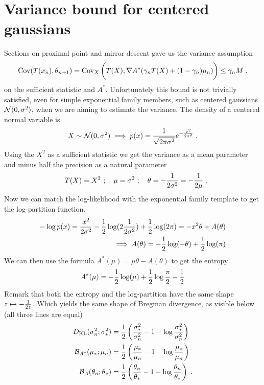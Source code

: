\documentclass{article}
\newcommand{\logpart}{A}
\newcommand{\conj}{\logpart^*}
\newcommand{\bregman}{\cB_\logpart}
\newcommand{\bregmanconj}{\cB_{\logpart^*}}
\newcommand{\natp}{\theta}
\newcommand{\lr}{\gamma} %
\begin{document}
\section{Variance bound for centered gaussians}
\label{sec:gaussian-variance}
Sections on proximal point and mirror descent gave us the variance assumption 
\begin{align}
	\Cov(T(x_{n}) , \natp_{n+1}) = \Cov_X \bigg(T(X), \nabla \conj (\lr_n T(X) + (1-\lr_n)\mu_n)\bigg	) 
	\leq \lr_n M \; .
\end{align}
on the sufficient statistic and $\conj$. Unfortunately this bound is not trivially satisfied, even for simple exponential family members, such as centered gaussians ${\mathcal N}(0,\sigma^2)$, when we are aiming to estimate the variance.
The density of a centered normal variable is
\begin{align}
	X \sim {\mathcal N}(0,\sigma^2) \implies p(x) = \frac{1}{\sqrt{2\pi \sigma^2}} e^{-\frac{x^2}{2 \sigma^2}} \; .
\end{align}
Using the $X^2$ as a sufficient statistic we get the variance as a mean parameter and minus half the precision as a natural parameter
\begin{align}
	\quad T(X)= X^2 \ ; \quad  \mu = \sigma^2 \ ; \quad   \natp = -\inv{2 \sigma^2} = -\inv{2 \mu}\; .
\end{align}
Now we can match the log-likelihood with the exponential family template to get the log-partition function.
\begin{align}
	-\log p(x) = \frac{x^2}{2 \sigma^2} - \half \log(2\inv{2\sigma^2}) + \half \log(2 \pi) 
	= -x^2 \natp + \logpart(\natp) \\
	\implies \logpart (\natp) = -\half \log(-\natp)  + \half \log(\pi)
\end{align}
We can then use the formula $\conj(\mu) = \mu \natp - \logpart(\natp)$ to get the entropy
\begin{align}
	\conj(\mu) = -\half \log(\mu) + \half \log\frac{\pi}{2} - \half \\
\end{align}
Remark that both the entropy and the log-partition have the same shape $z\mapsto -\frac{1}{2z}$. Which yields the same shape of Bregman divergence, as visible below (all three lines are equal)
\begin{align}
	\KL( \sigma_n^2 ; \sigma_*^2) 
	&= \half \left ( \frac{\sigma_*^2}{ \sigma_n^2} - 1 - \log \frac{\sigma_*^2}{ \sigma_n^2} \right) \\
	\bregmanconj( \mu_*; \mu_n) 
	&= \half \left ( \frac{\mu_*}{ \mu_n} - 1 - \log  \frac{\mu_*}{ \mu_n} \right) \\
	\bregman( \natp_n; \natp_* ) 
	&=  \half \left ( \frac{ \natp_n}{\natp_*} - 1 - \log  \frac{ \natp_n}{\natp_*} \right) \; .
\end{align}
\end{document}
